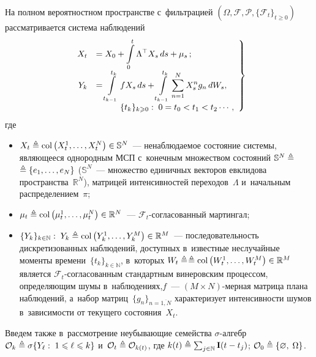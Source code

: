 \begin{multicols}{2}
 На полном вероятностном пространстве с~фильт\-ра\-цией 
 $(\Omega,\mathcal{F},\mathcal{P},\{\mathcal{F}_{t}\}_{t \geqslant 0})$ рассматривается система наблюдений
\begin{equation}
 \left.
 \begin{array}{rl}
 \displaystyle X_t &=X_0 +  \displaystyle
 \int\limits_0^t \Lambda^{\top}X_{s}\,ds + \mu_s\,;  \\[6pt]
 \displaystyle Y_k &=  \displaystyle\int\limits_{t_{k-1}}^{t_k}fX_s\,ds+
 \int\limits_{t_{k-1}}^{t_k} 
 \sum\limits_{n=1}^NX_s^ng_n \,dW_s, \\[6pt]
 &\hspace*{10mm}\{t_k\}_{k \geqslant 0}: \; 0 = t_0 < t_1 < t_2\cdots,
 \end{array}
 \right\}
 \label{eq:obsys_1}
 \end{equation}
 где
  \begin{itemize}
  \item
  $X_t \ebd \mathrm{col}\left(X_t^1,\ldots,X_t^N\right) \hm\in \mathbb{S}^N$~--- 
  ненаблюда\-емое состояние системы, являющееся однородным МСП с~конечным 
  множеством состояний $ \mathbb{S}^N \triangleq$\linebreak $\triangleq \{e_1,\ldots,e_N\}$ ($\mathbb{S}^N$~--- 
  множество единичных векторов евклидова пространства~$\mathbb{R}^N$), 
  матрицей интенсивностей переходов~$\Lambda$ и~начальным распределением~$\pi$;
  \item
  $\mu_t \ebd \mathrm{col}\left(
  \mu_t^1,\ldots,\mu_t^N\right)\hm\in \mathbb{R}^N$~--- 
  ${\mathcal{F}}_t$-со\-гла\-со\-ван\-ный мартингал;
  \item
  $\{Y_k\}_{k \in \mathbb{N}}:\;  Y_k \ebd \mathrm{col}\left(Y_k^1,\ldots,Y_k^M\right) 
  \hm\in \mathbb{R}^M$~--- последовательность дискретизованных наблюдений, 
  доступных в~известные неслучайные  моменты времени~$\{t_k\}_{k \in \mathbb{N}}$,
в~которых $W_t \triangleq$\linebreak $\ebd \mathrm{col}\left(W_t^1,\ldots,W_t^M\right) \hm\in \mathbb{R}^M$
 является ${\mathcal{F}}_t$-со\-гла\-со\-ван\-ным стандартным винеровским процессом, 
 определяющим шумы в~наблюдениях,\linebreak  $f$~--- $(M \times N)$-мер\-ная 
 мат\-ри\-ца плана наблюдений, а~набор мат\-риц~$\{g_n\}_{n=\overline{1,N}}$ 
 характеризует интенсивности шумов в~зависимости от текущего состояния~$X_t$.
  \end{itemize}
  
  Введем также в~рассмотрение неубывающие семейства $\sigma$-ал\-гебр 
  $\mathcal{O}_k \ebd \sigma\{ Y_{\ell}: \; 1 \hm\leqslant \ell \hm\leqslant k\}$ 
  и~$\mathcal{O}_t \triangleq  \mathcal{O}_{k(t)}$, где 
  $k(t) \triangleq \sum\nolimits_{j \in \mathbb{N}}\mathbf{I}(t-t_{j})$; 
  $\mathcal{O}_0 \triangleq \{\varnothing,\; \Omega\}$.
  

\end{multicols}
